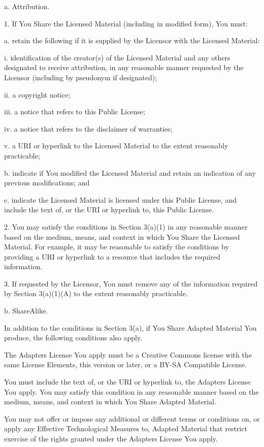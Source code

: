 a. Attribution. \begin{DoxyVerb} 1. If You Share the Licensed Material (including in modified
    form), You must:

      a. retain the following if it is supplied by the Licensor
         with the Licensed Material:

           i. identification of the creator(s) of the Licensed
              Material and any others designated to receive
              attribution, in any reasonable manner requested by
              the Licensor (including by pseudonym if
              designated);

          ii. a copyright notice;

         iii. a notice that refers to this Public License;

          iv. a notice that refers to the disclaimer of
              warranties;

           v. a URI or hyperlink to the Licensed Material to the
              extent reasonably practicable;

      b. indicate if You modified the Licensed Material and
         retain an indication of any previous modifications; and

      c. indicate the Licensed Material is licensed under this
         Public License, and include the text of, or the URI or
         hyperlink to, this Public License.

 2. You may satisfy the conditions in Section 3(a)(1) in any
    reasonable manner based on the medium, means, and context in
    which You Share the Licensed Material. For example, it may be
    reasonable to satisfy the conditions by providing a URI or
    hyperlink to a resource that includes the required
    information.

 3. If requested by the Licensor, You must remove any of the
    information required by Section 3(a)(1)(A) to the extent
    reasonably practicable.
\end{DoxyVerb}


b. Share\+Alike.

In addition to the conditions in Section 3(a), if You Share Adapted Material You produce, the following conditions also apply.


\begin{DoxyEnumerate}
\item The Adapter\textquotesingle{}s License You apply must be a Creative Commons license with the same License Elements, this version or later, or a B\+Y-\/\+SA Compatible License.
\item You must include the text of, or the U\+RI or hyperlink to, the Adapter\textquotesingle{}s License You apply. You may satisfy this condition in any reasonable manner based on the medium, means, and context in which You Share Adapted Material.
\item You may not offer or impose any additional or different terms or conditions on, or apply any Effective Technological Measures to, Adapted Material that restrict exercise of the rights granted under the Adapter\textquotesingle{}s License You apply.
\end{DoxyEnumerate}

